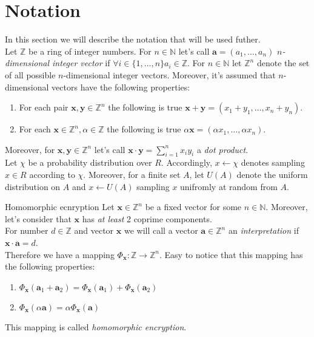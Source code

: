 \section{Notation}
	In this section we will describe the notation that will be used futher. \\
	Let $ \mathbb{Z} $ be a ring of integer numbers. For $ n \in \mathbb{N} $ let's call $ \textbf{a} = (a_1, \dots, a_n) $ \textit{$ n $-dimensional integer vector} if $ \forall i \in \{1, \dots, n\} a_i \in \mathbb{Z} $. For $ n \in \mathbb{N} $ let $ \mathbb{Z}^n $ denote the set of all possible $ n $-dimensional integer vectors. Moreover, it's assumed that $ n $-dimensional vectors have the following properties:
	\begin{enumerate}
		\item For each pair $ \textbf{x}, \textbf{y} \in \mathbb{Z}^n $  the following is true $ \textbf{x} + \textbf{y} = (x_1 + y_1, \dots, x_n + y_n) $.
		\item For each $ \textbf{x} \in \mathbb{Z}^n, \alpha \in \mathbb{Z} $ the following is true $ \alpha \textbf{x} = (\alpha x_1, \dots, \alpha x_n) $.
	\end{enumerate}
	Moreover, for $ \textbf{x}, \textbf{y} \in \mathbb{Z}^n $ let's call $ \textbf{x} \cdot \textbf{y} = \sum\limits_{i = 1}^n x_i y_i $ a \textit{dot product}. \\
	Let $ \chi $ be a probability distribution over $ R $. Accordingly, $ x \leftarrow \chi $ denotes sampling $ x \in R $ according to $ \chi $. Moreover, for a finite set $ A $, let $ U(A) $ denote the uniform distribution on $ A $ and $ x \leftarrow U(A) $ sampling $ x $ unifromly at random from $ A $.
	\begin{definition}{Homomorphic ecnryption}
		Let $ \textbf{x} \in \mathbb{Z}^n $ be a fixed vector for some $ n \in \mathbb{N} $. Moreover, let's consider that $ \textbf{x} $ has \textit{at least} 2 coprime components. \\
		For number $ d \in \mathbb{Z} $ and vector $ \textbf{x} $ we will call a vector $ \textbf{a} \in \mathbb{Z}^n $ an \textit{interpretation} if $ \textbf{x} \cdot \textbf{a} = d $. \\
		Therefore we have a mapping $ \Phi_{\textbf{x}}: \mathbb{Z} \rightarrow \mathbb{Z}^n $. Easy to notice that this mapping has the following properties:
		\begin{enumerate}
			\item $ \Phi_{\textbf{x}}(\textbf{a}_1 + \textbf{a}_2) = \Phi_{\textbf{x}}(\textbf{a}_1) + \Phi_{\textbf{x}}(\textbf{a}_2) $
			\item $ \Phi_{\textbf{x}}(\alpha \textbf{a}) = \alpha \Phi_{\textbf{x}}(\textbf{a}) $
		\end{enumerate}
		This mapping is called \textit{homomorphic encryption}.
	\end{definition}

		